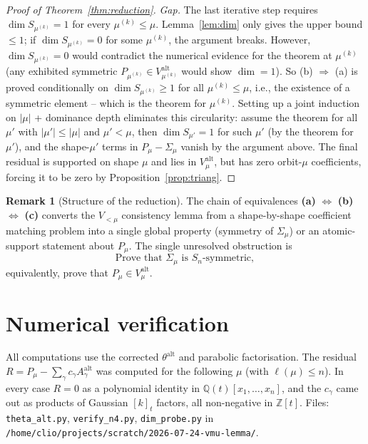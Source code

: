 \documentclass[11pt]{article}
\theoremstyle{definition}
\newtheorem{remark}[theorem]{Remark}
\newcommand{\alt}{\mathrm{alt}}
\newcommand{\ZZ}{\mathbb{Z}}
\newcommand{\QQ}{\mathbb{Q}}
\newcommand{\Sig}{\Sigma_\mu}
\begin{document}
\begin{proof}[Proof of Theorem~\ref{thm:reduction}]
\emph{Gap.}  The last iterative step requires $\dim S_{\mu^{(k)}}=1$
for every $\mu^{(k)}\le\mu$.  Lemma~\ref{lem:dim} only gives the upper
bound $\le 1$; if $\dim S_{\mu^{(k)}} = 0$ for some $\mu^{(k)}$, the
argument breaks.  However, $\dim S_{\mu^{(k)}} = 0$ would contradict
the numerical evidence for the theorem at $\mu^{(k)}$ (any exhibited
symmetric $P_{\mu^{(k)}}\in V_{\mu^{(k)}}^\alt$ would show $\dim = 1$).
So (b) $\Rightarrow$ (a) is proved conditionally on
$\dim S_{\mu^{(k)}} \ge 1$ for all $\mu^{(k)}\le \mu$, i.e., the
existence of a symmetric element -- which is the theorem for
$\mu^{(k)}$.  Setting up a joint induction on $|\mu|$ + dominance
depth eliminates this circularity: assume the theorem for all $\mu'$
with $|\mu'|\le|\mu|$ and $\mu'<\mu$, then $\dim S_{\mu'} = 1$ for such
$\mu'$ (by the theorem for $\mu'$), and the shape-$\mu'$ terms in
$P_\mu - \Sig$ vanish by the argument above.  The final residual is
supported on shape $\mu$ and lies in $V_\mu^\alt$, but has zero
orbit-$\mu$ coefficients, forcing it to be zero by
Proposition~\ref{prop:triang}.
\end{proof}

\begin{remark}[Structure of the reduction]
The chain of equivalences \textbf{(a)} $\Leftrightarrow$ \textbf{(b)}
$\Leftrightarrow$ \textbf{(c)} converts the $V_{<\mu}$ consistency
lemma from a shape-by-shape coefficient matching problem into a single
global property (symmetry of $\Sig$) or an atomic-support statement
about $P_\mu$.  The single unresolved obstruction is
\[
\boxed{\text{Prove that } \Sig \text{ is } S_n\text{-symmetric},}
\]
equivalently, prove that $P_\mu\in V_\mu^\alt$.
\end{remark}

\section{Numerical verification}\label{sec:numerics}

All computations use the corrected $\theta^\alt$ and parabolic
factorisation.  The residual $R = P_\mu - \sum_\gamma c_\gamma A^\alt_\gamma$
was computed for the following $\mu$ (with $\ell(\mu)\le n$).  In every
case $R = 0$ as a polynomial identity in $\QQ(t)[x_1,\dots,x_n]$, and
the $c_\gamma$ came out as products of Gaussian $[k]_t$ factors, all
non-negative in $\ZZ[t]$.  Files: \texttt{theta\_alt.py},
\texttt{verify\_n4.py}, \texttt{dim\_probe.py} in
\texttt{/home/clio/projects/scratch/2026-07-24-vmu-lemma/}.
\end{document}
